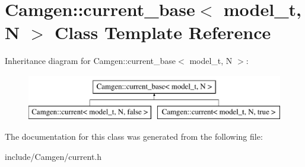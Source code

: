 \hypertarget{a00109}{}\section{Camgen\+:\+:current\+\_\+base$<$ model\+\_\+t, N $>$ Class Template Reference}
\label{a00109}
Inheritance diagram for Camgen\+:\+:current\+\_\+base$<$ model\+\_\+t, N $>$\+:\begin{figure}[H]
\begin{center}
\leavevmode
\includegraphics[height=2.000000cm]{a00109}
\end{center}
\end{figure}


The documentation for this class was generated from the following file\+:\begin{DoxyCompactItemize}
\item 
include/\+Camgen/current.\+h\end{DoxyCompactItemize}
